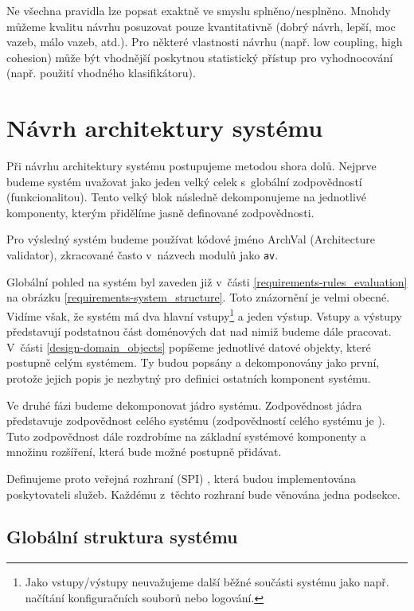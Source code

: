 Ne všechna pravidla lze popsat exaktně ve smyslu splněno/nesplněno. Mnohdy můžeme kvalitu návrhu posuzovat pouze kvantitativně (dobrý návrh, lepší, moc vazeb, málo vazeb, atd.). Pro některé vlastnosti návrhu (např. low coupling, high cohesion) může být vhodnější poskytnou statistický přístup pro vyhodnocování (např. použití vhodného klasifikátoru).

\section{Návrh architektury systému}
\label{design-architecture}

Při návrhu architektury systému postupujeme metodou shora dolů. Nejprve budeme systém uvažovat jako jeden velký celek s~globální zodpovědností (funkcionalitou). Tento velký blok následně dekomponujeme na jednotlivé komponenty, kterým přidělíme jasně definované zodpovědnosti.

Pro výsledný systém budeme používat kódové jméno ArchVal (Architecture validator), zkracované často v~názvech modulů jako \verb+av+.

Globální pohled na systém byl zaveden již v~části \ref{requirements-rules_evaluation} na obrázku \ref{requirements-system_structure}. Toto znázornění je velmi obecné. Vidíme však, že systém má dva hlavní vstupy\footnote{Jako vstupy/výstupy neuvažujeme další běžné součásti systému jako např. načítání konfiguračních souborů nebo logování.} a jeden výstup. Vstupy a výstupy představují podstatnou část doménových dat nad nimiž budeme dále pracovat. V~části \ref{design-domain_objects} popíšeme jednotlivé datové objekty, které postupně  celým systémem. Ty budou popsány a dekomponovány jako první, protože jejich popis je nezbytný pro definici ostatních komponent systému.

Ve druhé fázi budeme dekomponovat jádro systému. Zodpovědnost jádra představuje zodpovědnost celého systému (zodpovědností celého systému je ). Tuto zodpovědnost dále rozdrobíme na základní systémové komponenty a množinu rozšíření, která bude možné postupně přidávat.

Definujeme proto veřejná rozhraní (SPI) \cite{spi}, která budou implementována poskytovateli služeb. Každému z~těchto rozhraní bude věnována jedna podsekce.

\subsection{Globální struktura systému}

